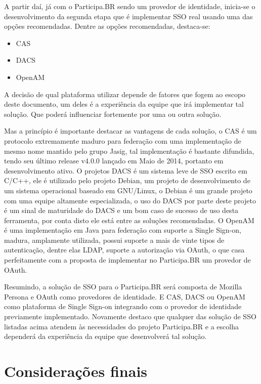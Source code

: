 \documentclass[11pt]{article}
\begin{document}
A partir daí, já com o Participa.BR sendo um provedor de identidade, inicia-se
o desenvolvimento da segunda etapa que é implementar SSO real usando uma das
opções recomendadas. Dentre as opções recomendadas, destaca-se:

\begin{itemize}
  \item{CAS}
  \item{DACS}
  \item{OpenAM}
\end{itemize}

A decisão de qual plataforma utilizar depende de fatores que fogem ao escopo
deste documento, um deles é a experiência da equipe que irá implementar tal
solução. Que poderá influenciar fortemente por uma ou outra solução.

Mas a princípio é importante destacar as vantagens de cada solução, o CAS é um
protocolo extremamente maduro para federação com uma implementação de mesmo
nome mantido pelo grupo Jasig, tal implementação é bastante difundida, tendo
seu último release v4.0.0 lançado em Maio de 2014, portanto em desenvolvimento
ativo. O projetos DACS é um sistema leve de SSO escrito em C/C++, ele é
utilizado pelo projeto Debian, um projeto de desenvolvimento de um sistema
operacional baseado em GNU/Linux, o Debian é um grande projeto com uma equipe
altamente especializada, o uso do DACS por parte deste projeto é um sinal de
maturidade do DACS e um bom caso de sucesso de uso desta ferramenta, por conta
disto ele está entre as soluções recomendadas. O OpenAM é uma implementação em
Java para federação com suporte a Single Sign-on, madura, amplamente
utilizada, possui suporte a mais de vinte tipos de autenticação, dentre elas
LDAP, suporte a autorização via OAuth, o que casa perfeitamente com a proposta
de implementar no Participa.BR um provedor de OAuth.

Resumindo, a solução de SSO para o Participa.BR será composta de Mozilla
Persona e OAuth como provedores de identidade. E CAS, DACS ou OpenAM como
plataforma de Single Sign-on integrando com o provedor de identidade
previamente implementado. Novamente destaco que qualquer das solução de SSO
listadas acima atendem às necessidades do projeto Participa.BR e a escolha
dependerá da experiência da equipe que desenvolverá tal solução.

\section{Considerações finais}
\end{document}
